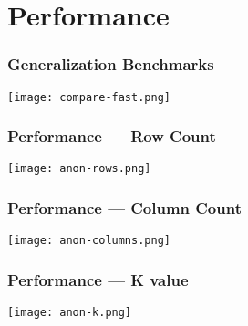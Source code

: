 \section{Performance}

\begin{frame}
    \frametitle{Generalization Benchmarks}
    \texttt{[image: compare-fast.png]}
\end{frame}

\begin{frame}
    \frametitle{Performance --- Row Count}
    \texttt{[image: anon-rows.png]}
\end{frame}

\begin{frame}
    \frametitle{Performance --- Column Count}
    \texttt{[image: anon-columns.png]}
\end{frame}

\begin{frame}
    \frametitle{Performance --- K value}
    \texttt{[image: anon-k.png]}
\end{frame}